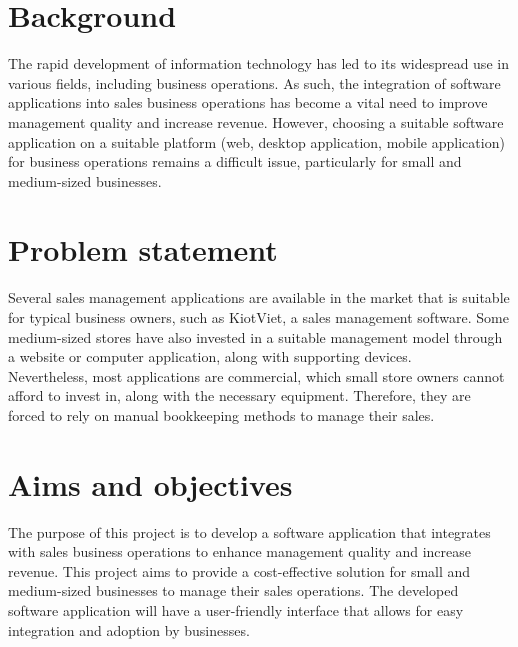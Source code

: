 \documentclass[../thesis.tex]{subfiles}
\begin{document}
\renewcommand*\thesection{\arabic{section}}

\section{Background}
The rapid development of information technology has led to its widespread use in various fields, including business operations. As such, the integration of software applications into sales business operations has become a vital need to improve management quality and increase revenue. However, choosing a suitable software application on a suitable platform (web, desktop application, mobile application) for business operations remains a difficult issue, particularly for small and medium-sized businesses.

\section{Problem statement}
Several sales management applications are available in the market that is suitable for typical business owners, such as KiotViet, a sales management software. Some medium-sized stores have also invested in a suitable management model through a website or computer application, along with supporting devices. \\ Nevertheless, most applications are commercial, which small store owners cannot afford to invest in, along with the necessary equipment. Therefore, they are forced to rely on manual bookkeeping methods to manage their sales.
\section{Aims and objectives}
The purpose of this project is to develop a software application that integrates with sales business operations to enhance management quality and increase revenue. This project aims to provide a cost-effective solution for small and medium-sized businesses to manage their sales operations. The developed software application will have a user-friendly interface that allows for easy integration and adoption by businesses.
\end{document}
